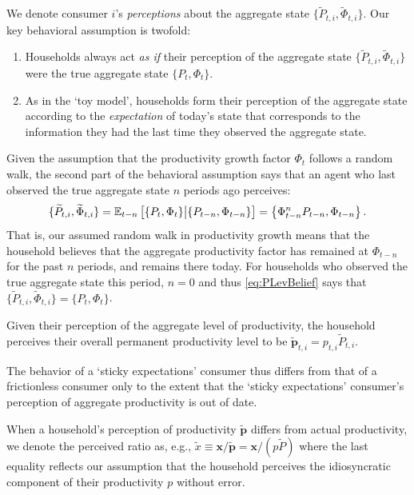 \documentclass[titlepage]{./econtex}
\begin{document}
We denote consumer $i$'s \textit{perceptions} about the aggregate state $\{\widetilde{P}_{t,i},\widetilde{\Phi}_{t,i}\}$.  Our key behavioral assumption is twofold:
\begin{enumerate}
\item Households always act \textit{as if} their perception of the aggregate state $\{\widetilde{P}_{t,i},\widetilde{\Phi}_{t,i}\}$ were the true aggregate state $\{P_t,\Phi_t\}$.

\item As in the `toy model', households form their perception of the aggregate state according to the \textit{expectation} of today's state that corresponds to the information they had the last time they observed the aggregate state.
\end{enumerate}
Given the assumption that the productivity growth factor $\Phi_t$ follows a random walk,
the second part of the behavioral assumption says that an agent who last observed the true
aggregate state $n$ periods ago perceives:
\begin{equation}\label{eq:PLevBelief}
\{\widetilde{P}_{t,i},\widetilde{\Phi}_{t,i}\} = \operatorname{\mathbb{E}}_{t-n}\big[\{P_t,\Phi_t\} \big| \{P_{t-n},\Phi_{t-n}\}\big] = \left\{\Phi_{t-n}^{n} P_{t-n},\Phi_{t-n}\right\}.
\end{equation}
That is, our assumed random walk in productivity growth means that the household believes that the aggregate productivity factor has remained at $\Phi_{t-n}$ for the past $n$ periods, and remains there today. For households who observed the true aggregate state this period, $n=0$ and thus \eqref{eq:PLevBelief} says that $\{\widetilde{P}_{t,i},\widetilde{\Phi}_{t,i}\} = \{P_t,\Phi_t\}$.

Given their perception of the aggregate level of productivity, the household perceives their overall permanent productivity level to be $\widetilde{\pmb{p}}_{t,i} = p_{t,i} \widetilde{P}_{t,i}$.

The behavior of a `sticky expectations' consumer thus differs from that of a frictionless consumer only to the extent that the `sticky expectations' consumer's perception of aggregate productivity is out of date.

When a household's perception of productivity $\widetilde{\pmb{p}}$ differs from actual productivity, we denote the perceived ratio as, e.g., $\widetilde{x} \equiv \mathbf{x}/\widetilde{\pmb{p}} = \mathbf{x}/({p}\widetilde{P})$ where the last equality reflects our assumption that the household perceives the idiosyncratic component of their productivity ${p}$ without error.
\end{document}
